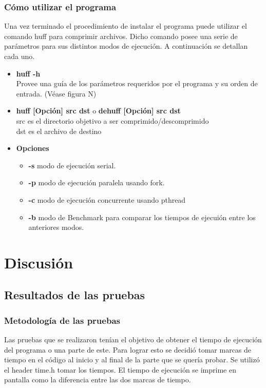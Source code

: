 \documentclass{report}
\begin{document}
\subsubsection{Cómo utilizar el programa}
Una vez terminado el procedimiento de instalar el programa puede utilizar el comando huff para comprimir archivos. Dicho comando posee una serie de parámetros para sus distintos modos de ejecución. A continuación se detallan cada uno.
\begin{itemize}
  \item \textbf{huff -h}\\ \hspace{2cm}
    Provee una guía de los parámetros requeridos por el programa y su orden de entrada. (Véase figura N)
  \item \textbf{huff [Opción] src dst} o \textbf{dehuff [Opción] src dst}\\
src es el directorio objetivo a ser comprimido/descomprimido\\
dst es el archivo de destino
  \item \textbf{Opciones} 
    \begin{itemize}
      \item \textbf{-s} modo de ejecución serial.
      \item \textbf{-p} modo de ejecución paralela usando fork.
      \item \textbf{-c} modo de ejecución concurrente usando pthread
      \item \textbf{-b} modo de Benchmark para comparar los tiempos de ejecuión entre los anteriores modos.
    \end{itemize}
\end{itemize}





\section{Discusión}
\subsection{Resultados de las pruebas}
\subsubsection{Metodología de las pruebas}

Las pruebas que se realizaron tenían el objetivo de obtener el tiempo de ejecución del programa o una parte de este. Para lograr esto se decidió tomar marcas de tiempo en el código al inicio y al final de la parte que se quería probar. Se utilizó el header time.h tomar los tiempos. El tiempo de ejecución  se imprime en pantalla como la diferencia entre las dos marcas de tiempo.
\end{document}
